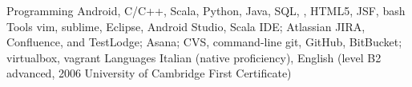 \begin{cvskills}
  \cvskill
    {Programming}
    {Android, C/C++, Scala, Python, Java, SQL, \LaTeXe{}, HTML5, JSF, bash}
  \cvskill
  {Tools}
  {vim, sublime, Eclipse, Android Studio,
     Scala IDE;
   Atlassian JIRA, Confluence, and
   TestLodge;  Asana;
   CVS, command-line git, GitHub, BitBucket;
   virtualbox, vagrant
  }
  \cvskill
    {Languages}
    {Italian (native proficiency), English 
   (level B2 advanced, 2006 University of Cambridge First Certificate)}


\end{cvskills}
